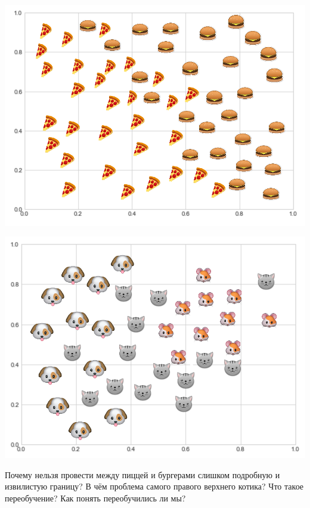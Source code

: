 \documentclass[12pt, a4paper, oneside]{article}
\begin{document}
\begin{minipage}[t]{0.45\textwidth}
	\includegraphics[scale=0.25]{class_1.png}
\end{minipage}
\hfill
\begin{minipage}[t]{0.45\textwidth}
	\includegraphics[scale=0.25]{class_2.png}
\end{minipage}

Почему нельзя провести между пиццей и бургерами слишком подробную и извилистую границу? В чём проблема самого правого верхнего котика? Что такое переобучение?  Как понять переобучились ли мы? 

\end{document}
